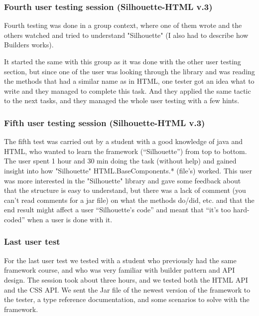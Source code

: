 \documentclass[12pt]{article}
\begin{document}
        \subsubsection{Fourth user testing session (Silhouette-HTML v.3)}

        Fourth testing was done in a group context, where one of them wrote and the others watched and tried to understand "Silhouette" (I also had to describe how Builders works).

        It started the same with this group as it was done with the other user testing section, but since one of the user was looking through the library and was reading the methods that had a similar name as in HTML, one tester got an idea what to write and they managed to complete this task. And they applied the same tactic to the next tasks, and they managed the whole user testing with a few hints. 

        \subsubsection{Fifth user testing session (Silhouette-HTML v.3)}

        The fifth test was carried out by a student with a good knowledge of java and HTML, who wanted to learn the framework (“Silhouette”) from top to bottom. The user spent 1 hour and 30 min doing the task (without help) and gained insight into how "Silhouette" HTML.BaseComponents.* (file's) worked. This user was more interested in the "Silhouette" library and gave some feedback about that the structure is easy to understand, but there was a lack of comment (you can't read comments for a jar file) on what the methods do/did, etc. and that the end result might affect a user “Silhouette’s code” and meant that “it’s too hard-coded” when a user is done with it.

        \subsubsection{Last user test}

        For the last user test we tested with a student who previously had the same framework course, and who was very familiar with builder pattern and API design. The session took about three hours, and we tested both the HTML API and the CSS API. We sent the Jar file of the newest version of the framework to the tester, a type reference documentation, and some scenarios to solve with the framework.
\end{document}
